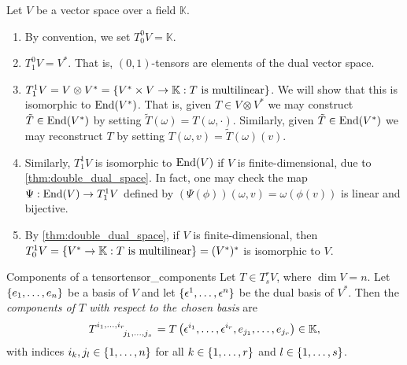 \begin{example}
    Let \(V\) be a vector space over a field \(\mathbb{K}\).
    \begin{enumerate}[label=(\alph*)]
        \item By convention, we set \(T_0^0 V = \mathbb{K}\).
        \item \(T_1^0V = V^\ast\). That is, \((0,1)\)-tensors are elements of the dual vector space.
        \item \(T_1^1V = V \otimes V^\ast = \{V^\ast \times V \to \mathbb{K} : T\text{ is multilinear}\}\). We will show that this is isomorphic to \(\operatorname{End}(V^\ast)\). That is, given \(T \in V \otimes V^\ast\) we may construct \(\tilde{T} \in \operatorname{End}(V^\ast)\) by setting \(\tilde{T}(\omega) = T(\omega, \cdot)\). Similarly, given \(\tilde{T} \in \operatorname{End}(V^\ast)\) we may reconstruct \(T\) by setting \(T(\omega, v) = \tilde{T}(\omega)(v)\).
        \item Similarly, \(T_1^1V\) is isomorphic to \(\operatorname{End}(V)\) if \(V\) is finite-dimensional, due to \cref{thm:double_dual_space}. In fact, one may check the map \(\Psi : \operatorname{End}(V) \to T_1^1 V\) defined by \((\Psi(\phi))(\omega, v) = \omega(\phi(v))\) is linear and bijective.
        \item By \cref{thm:double_dual_space}, if \(V\) is finite-dimensional, then \(T_0^1 V = \{V ^{\ast} \to \mathbb{K} : T \text{ is multilinear}\} = (V ^{\ast})^{\ast}\) is isomorphic to \(V\).
    \end{enumerate}
\end{example}

\begin{definition}{Components of a tensor}{tensor_components}
    Let \(T\in T_s^r V\), where \(\dim V = n\). Let \(\{e_1, \dots, e_n\}\) be a basis of \(V\) and let \(\{\epsilon^1, \dots, \epsilon^n\}\) be the dual basis of \(V ^{\ast}\). Then the \emph{components of \(T\) with respect to the chosen basis} are
    \begin{equation*}
        T\indices{^{i_1, \dots, i_r}_{j_1, \dots, j_s}} = T\left(\epsilon^{i_1}, \dots, \epsilon^{i_r}, e_{j_1}, \dots, e_{j_r}\right) \in \mathbb{K},
    \end{equation*}
    with indices \(i_k, j_l \in \{1, \dots, n\}\) for all \(k \in \{1, \dots, r\}\) and \(l \in \{1, \dots, s\}\).
\end{definition}

